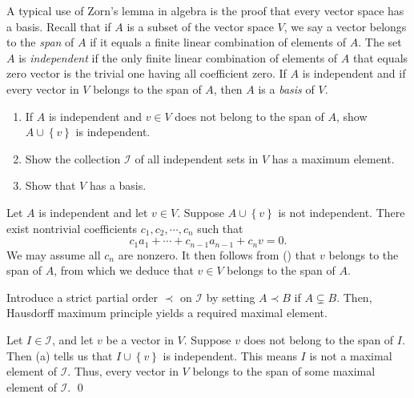 \documentclass[a4paper,12pt]{article}
\begin{document}
\begin{exe}
	A typical use of Zorn's lemma in algebra is the proof that every vector space has a basis.
	Recall that if \( A \) is a subset of the vector space \( V \),
	we say a vector belongs to the \textit{span} of \( A \)
	if it equals a finite linear combination of elements of \( A \).
	The set \( A \) is \textit{independent} if the only finite linear combination of elements of \( A \) that equals zero vector is the trivial one having all coefficient zero.
	If \( A \) is independent and if every vector in \( V \) belongs to the span of \( A \),
	then \( A \) is a \textit{basis} of \( V \).
	\begin{enumerate}
		\item
		      If \( A \) is independent and \( v \in V \) does not belong to the span of \( A \),
		      show \( A \cup \left\{ v \right\} \) is independent.
		      
		\item
		      Show the collection \( \mathcal{I} \) of all independent sets in \( V \) has a maximum element.
		      
		\item
		      Show that \( V \) has a basis.
	\end{enumerate}
\end{exe}
\begin{sol}\leavevmode \par
	Let \( A \) is independent  and let \( v \in V \).
	Suppose \( A \cup \left\{ v \right\} \) is not independent.
	There exist nontrivial coefficients \( c_1,c_2,\cdots,c_n \)
	such that
	\begin{equation}\label{eq:dependent_linear}
		c_1 a_1 + \cdots + c_{n-1}a_{n-1} + c_n v = 0.
	\end{equation}
	We may assume all \( c_n \) are nonzero.
	It then follows from () that
	\( v \) belongs to the span of \( A \),
	from which we deduce that
	\( v \in V \) belongs to the span of \( A \).
	
	Introduce a strict partial order \( \prec \) on \( \mathcal{I} \) by setting
	\( A \prec B \) if \( A \subsetneq B \).
	Then, Hausdorff maximum principle yields a required maximal element.
	
	Let \( I \in \mathcal{I} \), and let \( v \) be a vector in \( V \).
	Suppose \( v \) does not belong to the span of \( I \).
	Then (a) tells us that \( I \cup \left\{ v \right\} \) is independent.
	This means \( I \) is not a maximal element of \( \mathcal{I} \).
	Thus, every vector in \( V \) belongs to the span of some maximal element of \( \mathcal{I} \).
	\qed\end{sol}
\end{document}

